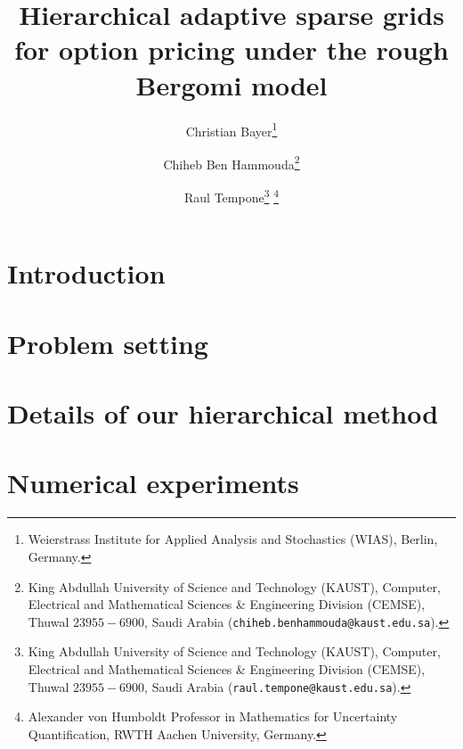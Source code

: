 \documentclass[11pt]{article}
\title{Hierarchical adaptive sparse  grids for option pricing under the rough Bergomi model}
\author{Christian Bayer\thanks{
 Weierstrass Institute for Applied Analysis and Stochastics (WIAS),
 Berlin, Germany.}
        \and Chiheb Ben Hammouda\thanks{King Abdullah University of Science and Technology (KAUST), Computer, Electrical and Mathematical Sciences \& Engineering Division (CEMSE), Thuwal $23955-6900$, Saudi Arabia ({\tt chiheb.benhammouda@kaust.edu.sa}).} 
\and  Raul Tempone\thanks{King Abdullah University of Science and Technology (KAUST), Computer, Electrical and Mathematical Sciences \& Engineering Division (CEMSE), Thuwal $23955-6900$, Saudi Arabia ({\tt raul.tempone@kaust.edu.sa}).} \thanks{Alexander von Humboldt Professor in Mathematics for Uncertainty Quantification, RWTH Aachen University, Germany.}}
\begin{document}
\maketitle

\begin{abstract}
	  
\end{abstract}






\thispagestyle{plain}

\setcounter{tocdepth}{1}


 \section{Introduction}




 \section{Problem setting}\label{sec:Problem setting}




\section{Details of our hierarchical method}\label{sec:Details our approach and error bounds}





%
%


%

  \section{Numerical experiments}\label{sec:Numerical tests}

\end{document}
